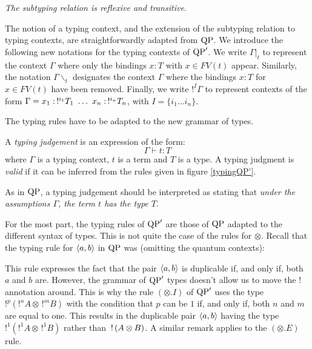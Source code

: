 \begin{proposition} \it The subtyping relation is reflexive and transitive.
\end{proposition}

The notion of a typing context, and the extension of the subtyping relation to typing contexts, are straightforwardly adapted from ${\rm QP}$. We introduce the following new notations for the typing contexts of ${\rm QP}'$. We write $\Gamma|_t$ to represent the context $\Gamma$ where only the bindings $x : T$ with $x \in FV(t)$ appear. Similarly, the notation $\Gamma \backslash_t$ designates the context $\Gamma$ where the bindings $x : T$ for $x \in FV(t)$ have been removed. Finally, we write $!^I \Gamma$ to represent contexts of the form $\Gamma = x_1 : \,!^{i_1} T_1 ~ \dots ~ x_n : \,!^{i_n} T_n$, with $I = \{i_1 \dots i_n\}$.

The typing rules have to be adapted to the new grammar of types.

\begin{defn}
A \emph{typing judgement} is an expression of the form:
\[
\Gamma \vdash t:T
\] 
where $\Gamma$ is a typing context, $t$ is a term and $T$ is a type. A typing judgment is \emph{valid} if it can be inferred from the rules given in figure \ref{typingQP'}.
\end{defn}

As in ${\rm QP}$, a typing judgement should be interpreted as stating that \textit{under the assumptions $\Gamma$, the term $t$ has the type $T$}. 

\begin{remark} For the most part, the typing rules of ${\rm QP}'$ are those of ${\rm QP}$ adapted to the different syntax of types. This is not quite the 
	case of the rules for $\otimes$. Recall that the typing rule for $\langle a, b \rangle$ in ${\rm QP}$ was (omitting the quantum contexts):
		\begin{prooftree}
		\end{prooftree}
	This rule expresses the fact that the pair $\langle a, b \rangle$ is duplicable if, and only if, both $a$ and $b$ are. However, the grammar of 
	${\rm QP}'$ types doesn't allow us to move the $!$ annotation around. This is why the rule $(\otimes.I)$ of ${\rm QP}'$ uses the type 
	$!^p(!^nA \otimes \,!^mB)$ with the condition that $p$ can be $1$ if, and only if, both $n$ and $m$ are equal to one. This results in 
	the duplicable pair $\langle a, b \rangle$ having the type $!^1(!^1 A \otimes \,!^1B)$ rather than $\,!\, (A \otimes B)$. A similar remark applies 
	to the $(\otimes.E)$ rule.
\end{remark}

